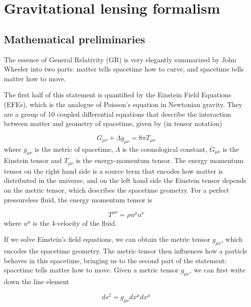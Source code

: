 \chapter{Gravitational lensing formalism}
\label{chapter:gravitational-lensing-formalism}

\section{Mathematical preliminaries}

The essence of General Relativity (GR) is very elegantly summarized by John Wheeler \citep[pg.235]{wheeler2000geons} into two parts: matter tells spacetime how to curve, and spacetime tells matter how to move. 

The first half of this statement is quantified by the Einstein Field Equations (EFEs), which is the analogue of Poisson's equation in Newtonian gravity. They are a group of 10 coupled differential equations that describe the interaction between matter and geometry of spacetime, given by (in tensor notation)

\begin{equation}
  G_{\mu \nu} + \Lambda g_{\mu \nu} = 8\pi T_{\mu \nu}
  \label{eq:efes}
\end{equation}
where $g_{\mu \nu}$ is the metric of spacetime, $\Lambda$ is the cosmological constant, $G_{\mu \nu}$ is the Einstein tensor and $T_{\mu \nu}$ is the energy-momentum tensor. The energy momentum tensor on the right hand side is a source term that encodes how matter is distributed in the universe, and on the left hand side the Einstein tensor depends on the metric tensor, which describes the spacetime geometry. For a perfect pressureless fluid, the energy momentum tensor is

\begin{equation}
  T^{\mu \nu} = \rho u^{\mu} u^{\nu}
\end{equation}
where $u^{\mu}$ is the 4-velocity of the fluid. 

If we solve Einstein's field equations, we can obtain the metric tensor $g_{\mu \nu}$, which encodes the spacetime geometry. The metric tensor then influences how a particle behaves in this spacetime, bringing us to the second part of the statement: spacetime tells matter how to move. Given a metric tensor $g_{\mu \nu}$, we can first write down the line element

\begin{equation}
  ds^2 = g_{\mu \nu} dx^{\mu} dx^{\mu}
  \label{eq:line-element}
\end{equation}

